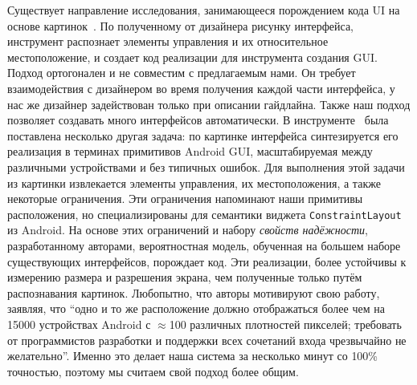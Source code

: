 Существует направление исследования, занимающееся порождением кода UI на основе картинок~\cite{Cai2023}. По полученному от дизайнера рисунку интерфейса,  инструмент распознает элементы управления и их относительное местоположение, и создает код реализации для инструмента создания GUI.
Подход ортогонален и не совместим с предлагаемым нами. Он требует взаимодействия с дизайнером во время получения каждой части интерфейса, у нас же дизайнер задействован только при описании гайдлайна. Также наш подход позволяет создавать много интерфейсов автоматически. В инструменте~\cite{Robust} была поставлена несколько другая задача: по картинке интерфейса синтезируется его реализация в терминах примитивов Android GUI, масштабируемая между различными устройствами и без типичных ошибок. Для выполнения этой задачи из картинки извлекается элементы управления, их местоположения, а также некоторые ограничения.
Эти ограничения напоминают наши примитивы расположения, но специализированы для семантики виджета \texttt{ConstraintLayout}~\cite{ConstraintLayout} из Android.
На основе этих ограничений и набору \emph{свойств надёжности}, разработанному авторами, вероятностная модель, обученная на большем наборе существующих интерфейсов, порождает код. Эти реализации, более устойчивы к измерению размера и  разрешения экрана, чем полученные только путём распознавания картинок.
Любопытно, что авторы мотивируют свою работу, заявляя, что \enquote{одно и то же расположение должно отображаться более чем на 15000 устройствах Android с $\approx$100 различных плотностей пикселей; требовать от программистов разработки и поддержки всех сочетаний входа чрезвычайно не желательно}.
Именно   это делает наша система за несколько минут со 100\% точностью, поэтому мы считаем свой подход более общим.

